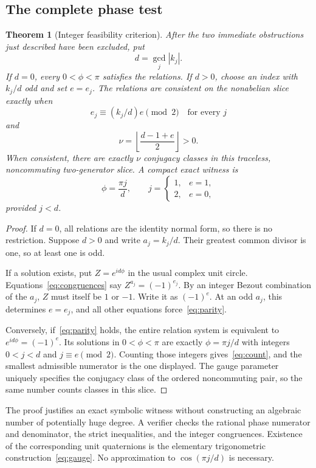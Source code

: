 \documentclass[11pt]{article}
\newtheorem{theorem}{Theorem}[section]
\theoremstyle{definition}
\theoremstyle{remark}
\begin{document}
\subsection{The complete phase test}
\begin{theorem}[Integer feasibility criterion]
\label{thm:phase}
After the two immediate obstructions just described have been excluded, put
\[
d=\gcd_j|k_j|.
\]
If $d=0$, every $0<\phi<\pi$ satisfies the relations. If $d>0$, choose an index with $k_j/d$ odd and set $e=e_j$. The relations are consistent on the nonabelian slice exactly when
\begin{equation}
e_j\equiv (k_j/d)e\pmod2\quad\text{for every }j
\label{eq:parity}
\end{equation}
and
\begin{equation}
\nu=\left\lfloor\frac{d-1+e}{2}\right\rfloor>0.
\label{eq:count}
\end{equation}
When consistent, there are exactly $\nu$ conjugacy classes in this traceless, noncommuting two-generator slice. A compact exact witness is
\[
\phi=\frac{\pi j}{d},\qquad
j=\begin{cases}1,&e=1,\\2,&e=0,\end{cases}
\]
provided $j<d$.
\end{theorem}
\begin{proof}
If $d=0$, all relations are the identity normal form, so there is no restriction. Suppose $d>0$ and write $a_j=k_j/d$. Their greatest common divisor is one, so at least one is odd.

If a solution exists, put $Z=e^{id\phi}$ in the usual complex unit circle. Equations~\eqref{eq:congruences} say $Z^{a_j}=(-1)^{e_j}$. By an integer Bezout combination of the $a_j$, $Z$ must itself be $1$ or $-1$. Write it as $(-1)^e$. At an odd $a_j$, this determines $e=e_j$, and all other equations force~\eqref{eq:parity}.

Conversely, if~\eqref{eq:parity} holds, the entire relation system is equivalent to $e^{id\phi}=(-1)^e$. Its solutions in $0<\phi<\pi$ are exactly $\phi=\pi j/d$ with integers $0<j<d$ and $j\equiv e\pmod2$. Counting those integers gives~\eqref{eq:count}, and the smallest admissible numerator is the one displayed. The gauge parameter uniquely specifies the conjugacy class of the ordered noncommuting pair, so the same number counts classes in this slice.
\end{proof}

The proof justifies an exact symbolic witness without constructing an algebraic number of potentially huge degree. A verifier checks the rational phase numerator and denominator, the strict inequalities, and the integer congruences. Existence of the corresponding unit quaternions is the elementary trigonometric construction~\eqref{eq:gauge}. No approximation to $\cos(\pi j/d)$ is necessary.
\end{document}
